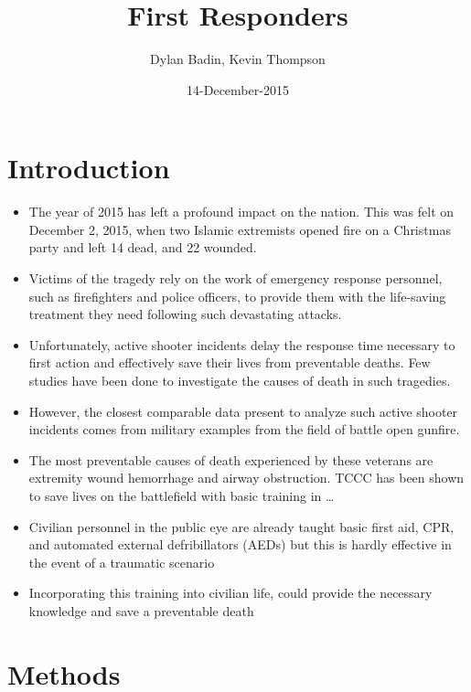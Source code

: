 \documentclass[]{article}
\title{First Responders}
\author{Dylan Badin, Kevin Thompson}
\date{14-December-2015}
\begin{document}
\maketitle

\section{Introduction}\label{introduction}

\begin{itemize}
\itemsep1pt\parskip0pt
\item
  The year of 2015 has left a profound impact on the nation. This was
  felt on December 2, 2015, when two Islamic extremists opened fire on a
  Christmas party and left 14 dead, and 22 wounded.
\item
  Victims of the tragedy rely on the work of emergency response
  personnel, such as firefighters and police officers, to provide them
  with the life-saving treatment they need following such devastating
  attacks.
\item
  Unfortunately, active shooter incidents delay the response time
  necessary to first action and effectively save their lives from
  preventable deaths. Few studies have been done to investigate the
  causes of death in such tragedies.
\item
  However, the closest comparable data present to analyze such active
  shooter incidents comes from military examples from the field of
  battle open gunfire.
\item
  The most preventable causes of death experienced by these veterans are
  extremity wound hemorrhage and airway obstruction. TCCC has been shown
  to save lives on the battlefield with basic training in \ldots{}
\item
  Civilian personnel in the public eye are already taught basic first
  aid, CPR, and automated external defribillators (AEDs) but this is
  hardly effective in the event of a traumatic scenario
\item
  Incorporating this training into civilian life, could provide the
  necessary knowledge and save a preventable death
\end{itemize}

\section{Methods}\label{methods}
\end{document}
